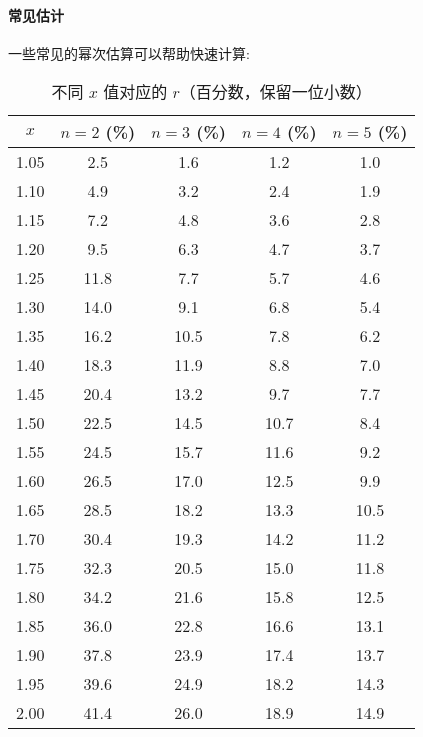 \paragraph{常见估计} 一些常见的幂次估算可以帮助快速计算:
\begin{table}[htbp]
	\centering
	\caption{不同 $ x $ 值对应的 $ r $（百分数，保留一位小数）}
	\label{tab:r_values}
	\begin{tabular}{|c|c|c|c|c|}
		\hline
		$ x $ & $ n=2 $ (\%) & $ n=3 $ (\%) & $ n=4 $ (\%) & $ n=5 $ (\%) \\ \hline
		1.05  & 2.5          & 1.6          & 1.2          & 1.0          \\ \hline
		1.10  & 4.9          & 3.2          & 2.4          & 1.9          \\ \hline
		1.15  & 7.2          & 4.8          & 3.6          & 2.8          \\ \hline
		1.20  & 9.5          & 6.3          & 4.7          & 3.7          \\ \hline
		1.25  & 11.8         & 7.7          & 5.7          & 4.6          \\ \hline
		1.30  & 14.0         & 9.1          & 6.8          & 5.4          \\ \hline
		1.35  & 16.2         & 10.5         & 7.8          & 6.2          \\ \hline
		1.40  & 18.3         & 11.9         & 8.8          & 7.0          \\ \hline
		1.45  & 20.4         & 13.2         & 9.7          & 7.7          \\ \hline
		1.50  & 22.5         & 14.5         & 10.7         & 8.4          \\ \hline
		1.55  & 24.5         & 15.7         & 11.6         & 9.2          \\ \hline
		1.60  & 26.5         & 17.0         & 12.5         & 9.9          \\ \hline
		1.65  & 28.5         & 18.2         & 13.3         & 10.5         \\ \hline
		1.70  & 30.4         & 19.3         & 14.2         & 11.2         \\ \hline
		1.75  & 32.3         & 20.5         & 15.0         & 11.8         \\ \hline
		1.80  & 34.2         & 21.6         & 15.8         & 12.5         \\ \hline
		1.85  & 36.0         & 22.8         & 16.6         & 13.1         \\ \hline
		1.90  & 37.8         & 23.9         & 17.4         & 13.7         \\ \hline
		1.95  & 39.6         & 24.9         & 18.2         & 14.3         \\ \hline
		2.00  & 41.4         & 26.0         & 18.9         & 14.9         \\ \hline
	\end{tabular}
\end{table}
